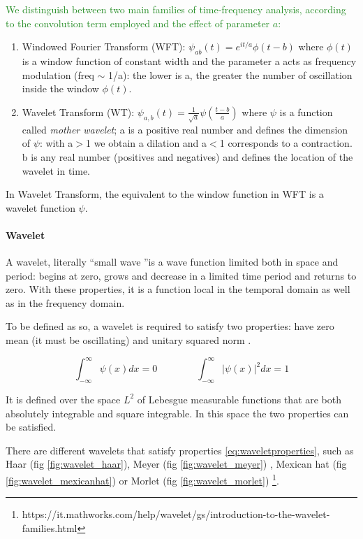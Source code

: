 \documentclass[11pt]{report}
\begin{document}
\textcolor{ForestGreen}{
We distinguish between two main families of time-frequency analysis, according to the convolution term employed and the effect of parameter $a$:
}
\begin{enumerate}
\item Windowed Fourier Transform (WFT): $\psi_{ab}(t) = e^{it/a}\phi(t-b)$ where $\phi(t)$ is a window function of constant width and the parameter a acts as frequency modulation (freq $\sim$ 1/a): the lower is a, the greater the number of oscillation inside the window $\phi(t)$.
\item Wavelet Transform (WT): $\psi_{a, b}(t) = \frac{1}{\sqrt{a}}\psi(\frac{t-b}{a})$ where $\psi$ is a function called \emph{mother wavelet}; a is a positive real number and defines the dimension of $\psi$: with a$>$1 we obtain a dilation and a$<$1 corresponds to a contraction. b is any real number (positives and negatives) and defines the location of the wavelet in time.
\end{enumerate}

In Wavelet Transform, the equivalent to the window function in WFT is a wavelet function $\psi$.

\paragraph{Wavelet} \hfill

A wavelet, literally \textquotedblleft small wave \textquotedblright is a wave function limited both in space and period: begins at zero, grows and decrease in a limited time period and returns to zero. With these properties, it is a function local in the temporal domain as well as in the frequency domain.

To be defined as so, a wavelet is required to satisfy two properties: have zero mean (it must be oscillating) and unitary squared norm \cite{percival-2013}.

\begin{equation}\label{eq:waveletproperties}
\int_{-\infty}^{\infty}\psi(x)dx = 0 \qquad \qquad  \int_{-\infty}^{\infty} |\psi(x)|^2 dx = 1
\end{equation}

It is defined over the space $L^2$ of Lebesgue measurable functions that are both absolutely integrable and square integrable. In this space the two properties can be satisfied.

There are different wavelets that satisfy properties \ref{eq:waveletproperties}, such as Haar (fig \ref{fig:wavelet_haar}), Meyer (fig \ref{fig:wavelet_meyer}) \cite{dabauchies-1992}, Mexican hat (fig \ref{fig:wavelet_mexicanhat}) or Morlet (fig \ref{fig:wavelet_morlet}) \footnote{https://it.mathworks.com/help/wavelet/gs/introduction-to-the-wavelet-families.html}.
\end{document}
